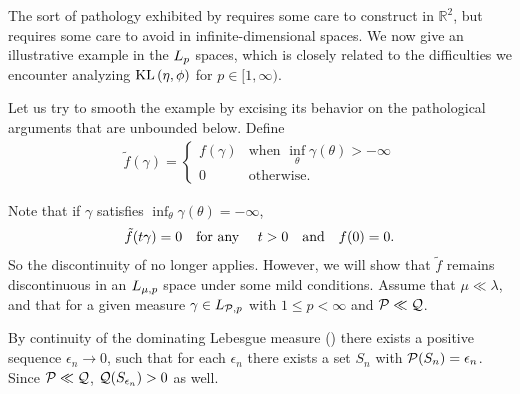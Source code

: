 The sort of pathology exhibited by 
requires some care to construct in $\mathbb{R}^2$, but requires some care to
avoid in infinite-dimensional spaces.  We now give an illustrative example in
the ${L_{p}}$ spaces, which is closely related to the difficulties we encounter
analyzing $\mathrm{KL}\left(\eta, \phi\right)$ for $p \in [1, \infty)$.

\begin{ex}
%
Let us try to smooth the example  by excising its
behavior on the pathological arguments that are unbounded below. Define
%
\begin{align*}
%
\tilde{f}(\gamma) = \begin{cases}
    f(\gamma) & \textrm{when }\inf_\theta \gamma(\theta) > -\infty \\
    0 & \textrm{otherwise}.
\end{cases}
%
\end{align*}

Note that if $\gamma$ satisfies $\inf_\theta \gamma(\theta) = -\infty$,
%
\begin{align*}
%
\tilde{f}(\t \gamma) = 0 \mathtxt{for any }\t > 0 \mathtxt{and} f(\phiz) = 0.
%
\end{align*}
%
So the discontinuity of  no longer applies.
However, we will show that $\tilde{f}$ remains discontinuous in an ${L_{\mu,p}}$
space under some mild conditions. Assume that $\mu \ll \lambda$, and that for a
given measure $\gamma \in {L_{\mathcal{P},p}}$ with $1 \le p < \infty$ and  $\mathcal{P} \ll \mathcal{Q}$.

By continuity of the dominating Lebesgue measure ()
there exists a positive sequence $\epsilon_n \rightarrow 0$, such that for each
$\epsilon_n$ there exists a set $S_n$ with $\mathcal{P}(S_n) = \epsilon_n$.
Since $\mathcal{P} \ll \mathcal{Q}$, $\mathcal{Q}(S_{\epsilon_n}) > 0$ as well.


\end{ex}
